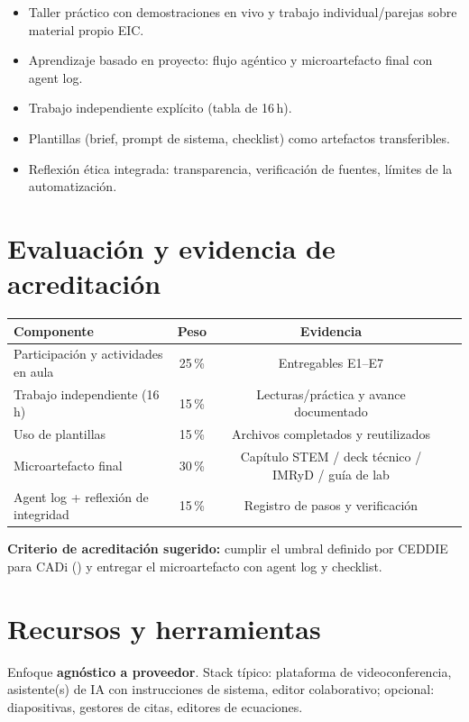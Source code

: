\begin{itemize}
\item Taller práctico con demostraciones en vivo y trabajo individual/parejas sobre material propio EIC.
\item Aprendizaje basado en proyecto: flujo agéntico y microartefacto final con agent log.
\item Trabajo independiente explícito (tabla de 16\,h).
\item Plantillas (brief, prompt de sistema, checklist) como artefactos transferibles.
\item Reflexión ética integrada: transparencia, verificación de fuentes, límites de la automatización.
\end{itemize}

\section{Evaluación y evidencia de acreditación}

\begin{tabularx}{\textwidth}{@{}XccX@{}}
\toprule
Componente & Peso & Evidencia \\
\midrule
Participación y actividades en aula & 25\,\% & Entregables E1--E7 \\
Trabajo independiente (16\,h) & 15\,\% & Lecturas/práctica y avance documentado \\
Uso de plantillas & 15\,\% & Archivos completados y reutilizados \\
Microartefacto final & 30\,\% & Capítulo STEM / deck técnico / IMRyD / guía de lab \\
Agent log + reflexión de integridad & 15\,\% & Registro de pasos y verificación \\
\bottomrule
\end{tabularx}

\textbf{Criterio de acreditación sugerido:} cumplir el umbral definido por CEDDIE para CADi (\ceddie) y entregar el microartefacto con agent log y checklist.

\section{Recursos y herramientas}

Enfoque \textbf{agnóstico a proveedor}. Stack típico: plataforma de videoconferencia, asistente(s) de IA con instrucciones de sistema, editor colaborativo; opcional: diapositivas, gestores de citas, editores de ecuaciones.


